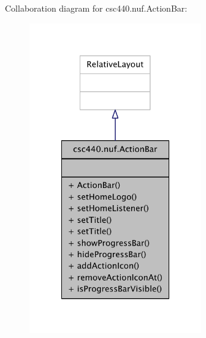 Collaboration diagram for csc440.\-nuf.\-Action\-Bar\-:
\nopagebreak
\begin{figure}[H]
\begin{center}
\leavevmode
\includegraphics[width=210pt]{classcsc440_1_1nuf_1_1_action_bar__coll__graph}
\end{center}
\end{figure}
